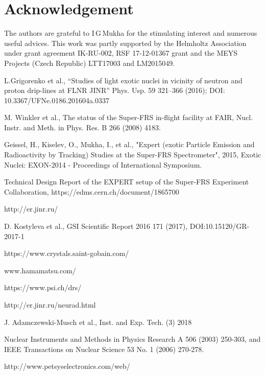 \documentclass{webofc}
\begin{document}
\section{Acknowledgement}
The authors are grateful to I\,G\,Mukha for the stimulating interest and numerous useful advices.
This  work was partly supported by the Helmholtz Association under grant agreement IK-RU-002, RSF 17-12-01367 grant and the MEYS Projects (Czech Republic) LTT17003 and LM2015049.
	
\begin{thebibliography}{99}
	L.Grigorenko et al., “Studies of light exotic nuclei in vicinity of neutron and proton drip-lines at FLNR JINR” Phys. Usp. 59 321–366 (2016); DOI: 10.3367/UFNe.0186.201604a.0337
		
	M. Winkler et al., The status of the Super-FRS in-flight facility at FAIR, Nucl. Instr. and Meth. in Phys. Res. B 266 (2008) 4183.
	
	Geissel, H., Kiselev, O., Mukha, I., et al., "Expert (exotic Particle Emission and Radioactivity by Tracking) Studies at the Super-FRS Spectrometer", 2015, Exotic Nuclei: EXON-2014 - Proceedings of International Symposium.
	
	Technical Design Report of the EXPERT setup of the Super-FRS Experiment Collaboration, https;//edms.cern.ch/document/1865700

	http://er.jinr.ru/

	D. Kostyleva et al., GSI Scientific Report 2016 171 (2017), DOI:10.15120/GR-2017-1
	
	https://www.crystals.saint-gobain.com/
	
	www.hamamatsu.com/
	
	https://www.psi.ch/drs/
	
	http://er.jinr.ru/neurad.html
	
	J. Adamczewski-Musch et al., Inst. and Exp. Tech. (3) 2018
	
	Nuclear Instruments and Methods in Physics Research A 506 (2003) 250-303, and
	IEEE Transactions on Nuclear Science 53 No. 1 (2006) 270-278.
	
	http://www.petsyselectronics.com/web/
	
\end{thebibliography}
\end{document}
